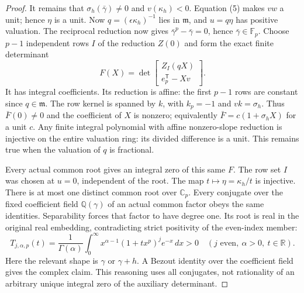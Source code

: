 \documentclass[11pt]{article}
\begin{document}
\begin{proof}
It remains that $\sigma_h(\bar\gamma)\ne0$ and $v(\kappa_h)<0$.
Equation (5) makes $v w$ a unit; hence $\eta$ is a unit.
Now $q=(\epsilon\kappa_h)^{-1}$ lies in $\mathfrak m$,
and $u=q\eta$ has positive valuation.
The reciprocal reduction now gives
$\bar\gamma^p-\bar\gamma=0$, hence $\bar\gamma\in\mathbb F_p$.
Choose $p-1$ independent rows $I$ of the reduction $Z(0)$ and
form the exact finite determinant
\[
 F(X)=\det\begin{bmatrix}
          Z_I(qX)\\ e_p^{\mathsf T}-Xv
        \end{bmatrix}.                                  \tag{6}
\]
It has integral coefficients.
Its reduction is affine: the first $p-1$ rows are constant since
$q\in\mathfrak m$.
The row kernel is spanned by $k$, with $k_p=-1$ and $v k=\sigma_h$.
Thus $\bar F(0)\ne0$ and the coefficient of $X$ is nonzero;
equivalently $\bar F=c(1+\sigma_h X)$ for a unit $c$.
Any finite integral polynomial with affine nonzero-slope reduction
is injective on the entire valuation ring: its divided difference
is a unit. This remains true when the valuation of $q$ is fractional.

Every actual common root gives an integral zero of this same $F$.
The row set $I$ was chosen at $u=0$, independent of the root.
The map $t\mapsto\eta=\kappa_h/t$ is injective.
There is at most one distinct common root over $\mathbb C_p$.
Every conjugate over the fixed coefficient field $\mathbb Q(\gamma)$
of an actual common factor obeys the same identities.
Separability forces that factor to have degree one.
Its root is real in the original real embedding, contradicting
strict positivity of the even-index member:
\[
 T_{j,\alpha,p}(t)=\frac1{\Gamma(\alpha)}
   \int_0^\infty x^{\alpha-1}(1+tx^p)^j e^{-x}\,dx>0
 \quad(j\text{ even},\ \alpha>0,\ t\in\mathbb R).
\]
Here the relevant shape is $\gamma$ or $\gamma+h$.
A Bezout identity over the coefficient field gives the complex claim.
This reasoning uses all conjugates, not rationality of an arbitrary
unique integral zero of the auxiliary determinant.
\end{proof}
\end{document}
